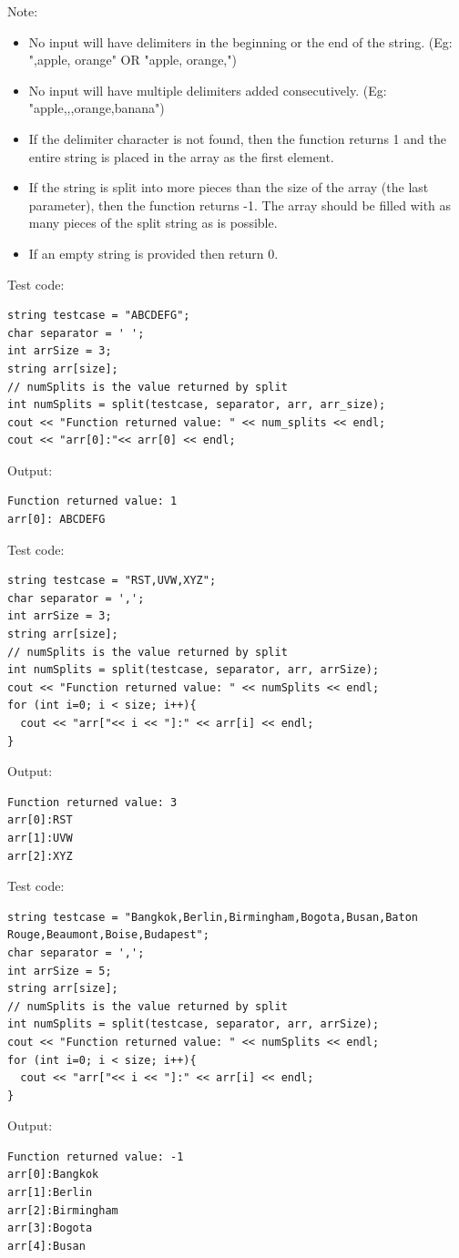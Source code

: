 Note:
\begin{itemize}
    \item No input will have delimiters in the beginning or the end of the string. (Eg: ",apple, orange" OR "apple, orange,")
    \item No input will have multiple delimiters added consecutively. (Eg: "apple,,,orange,banana")
    \item If the delimiter character is not found, then the function returns 1 and the entire string is placed in the array as the first element.
    \item If the string is split into more pieces than the size of the array (the last parameter), then the function returns -1. The array should be filled with as many pieces of the split string as is possible.
    \item If an empty string is provided then return 0.
\end{itemize}

\begin{example}
Test code:
\begin{verbatim}
string testcase = "ABCDEFG";
char separator = ' ';
int arrSize = 3;
string arr[size];
// numSplits is the value returned by split
int numSplits = split(testcase, separator, arr, arr_size);
cout << "Function returned value: " << num_splits << endl;
cout << "arr[0]:"<< arr[0] << endl;
\end{verbatim}
Output:
\begin{verbatim}
Function returned value: 1
arr[0]: ABCDEFG
\end{verbatim}
\end{example}

\begin{example}
Test code:
\begin{verbatim}
string testcase = "RST,UVW,XYZ";
char separator = ',';
int arrSize = 3;
string arr[size];
// numSplits is the value returned by split
int numSplits = split(testcase, separator, arr, arrSize);
cout << "Function returned value: " << numSplits << endl;
for (int i=0; i < size; i++){
  cout << "arr["<< i << "]:" << arr[i] << endl;
}
\end{verbatim}
Output:
\begin{verbatim}
Function returned value: 3
arr[0]:RST
arr[1]:UVW
arr[2]:XYZ
\end{verbatim}
\end{example}

\begin{example}
Test code:
\begin{verbatim}
string testcase = "Bangkok,Berlin,Birmingham,Bogota,Busan,Baton Rouge,Beaumont,Boise,Budapest";
char separator = ',';
int arrSize = 5;
string arr[size];
// numSplits is the value returned by split
int numSplits = split(testcase, separator, arr, arrSize);
cout << "Function returned value: " << numSplits << endl;
for (int i=0; i < size; i++){
  cout << "arr["<< i << "]:" << arr[i] << endl;
}
\end{verbatim}
Output:
\begin{verbatim}
Function returned value: -1
arr[0]:Bangkok
arr[1]:Berlin
arr[2]:Birmingham
arr[3]:Bogota
arr[4]:Busan
\end{verbatim}
\end{example}
